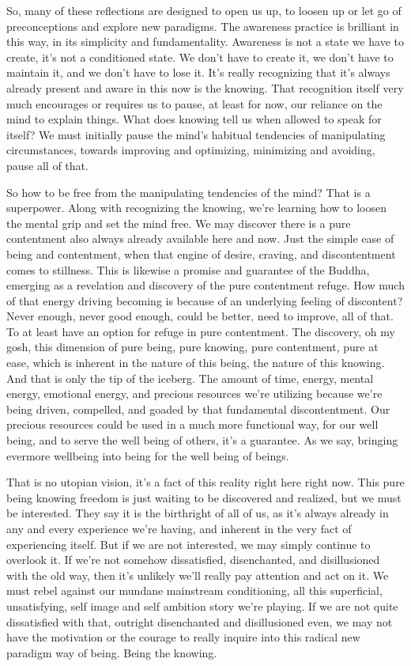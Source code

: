 \documentclass[12pt,openany]{book}
\begin{document}
So, many of these reflections are designed to open us up, to loosen up or let go of preconceptions and explore new paradigms. The awareness practice is brilliant in this way, in its simplicity and fundamentality. Awareness is not a state we have to create, it's not a conditioned state. We don't have to create it, we don't have to maintain it, and we don't have to lose it. It's really recognizing that it's always already present and aware in this now is the knowing. That recognition itself very much encourages or requires us to pause, at least for now, our reliance on the mind to explain things. What does knowing tell us when allowed to speak for itself? We must initially pause the mind's habitual tendencies of manipulating circumstances, towards improving and optimizing, minimizing and avoiding, pause all of that.

So how to be free from the manipulating tendencies of the mind? That is a superpower. Along with recognizing the knowing, we're learning how to loosen the mental grip and set the mind free. We may discover there is a pure contentment also always already available here and now. Just the simple ease of being and contentment, when that engine of desire, craving, and discontentment comes to stillness. This is likewise a promise and guarantee of the Buddha, emerging as a revelation and discovery of the pure contentment refuge. How much of that energy driving becoming is because of an underlying feeling of discontent? Never enough, never good enough, could be better, need to improve, all of that. To at least have an option for refuge in pure contentment. The discovery, oh my gosh, this dimension of pure being, pure knowing, pure contentment, pure at ease, which is inherent in the nature of this being, the nature of this knowing. And that is only the tip of the iceberg. The amount of time, energy, mental energy, emotional energy, and precious resources we're utilizing because we're being driven, compelled, and goaded by that fundamental discontentment. Our precious resources could be used in a much more functional way, for our well being, and to serve the well being of others, it's a guarantee. As we say, bringing evermore wellbeing into being for the well being of beings.

That is no utopian vision, it's a fact of this reality right here right now. This pure being knowing freedom is just waiting to be discovered and realized, but we must be interested. They say it is the birthright of all of us, as it's always already in any and every experience we're having, and inherent in the very fact of experiencing itself. But if we are not interested, we may simply continue to overlook it. If we're not somehow dissatisfied, disenchanted, and disillusioned with the old way, then it's unlikely we'll really pay attention and act on it. We must rebel against our mundane mainstream conditioning, all this superficial, unsatisfying,  self image and self ambition story we're playing. If we are not quite dissatisfied with that, outright disenchanted and disillusioned even, we may not have the motivation or the courage to really inquire into this radical new paradigm way of being. Being the knowing.
\end{document}

